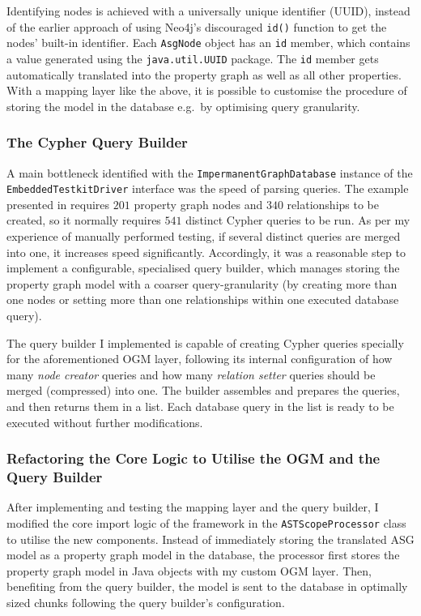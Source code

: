 Identifying nodes is achieved with a universally unique identifier (UUID), instead of the earlier approach of using Neo4j's discouraged \lstinline{id()} function to get the nodes' built-in identifier. Each \lstinline{AsgNode} object has an \lstinline{id} member, which contains a value generated using the \lstinline{java.util.UUID} package. The \lstinline{id} member gets automatically translated into the property graph as well as all other properties. With a mapping layer like the above, it is possible to customise the procedure of storing the model in the database e.g.\ by optimising query granularity.


\subsubsection{The Cypher Query Builder}

A main bottleneck identified with the \lstinline{ImpermanentGraphDatabase} instance of the \lstinline{EmbeddedTestkitDriver} interface was the speed of parsing queries. The example presented in  requires $201$ property graph nodes and $340$ relationships to be created, so it normally requires $541$ distinct Cypher queries to be run. As per my experience of manually performed testing, if several distinct queries are merged into one, it increases speed significantly. Accordingly, it was a reasonable step to implement a configurable, specialised query builder, which manages storing the property graph model with a coarser query-granularity (by creating more than one nodes or setting more than one relationships within one executed database query).

The query builder I implemented is capable of creating Cypher queries specially for the aforementioned OGM layer, following its internal configuration of how many \emph{node creator} queries and how many \emph{relation setter} queries should be merged (compressed) into one. The builder assembles and prepares the queries, and then returns them in a list. Each database query in the list is ready to be executed without further modifications.


\subsubsection{Refactoring the Core Logic to Utilise the OGM and the Query Builder}

After implementing and testing the mapping layer and the query builder, I modified the core import logic of the framework in the \lstinline{ASTScopeProcessor} class to utilise the new components. Instead of immediately storing the translated ASG model as a property graph model in the database, the processor first stores the property graph model in Java objects with my custom OGM layer. Then, benefiting from the query builder, the model is sent to the database in optimally sized chunks following the query builder's configuration.

